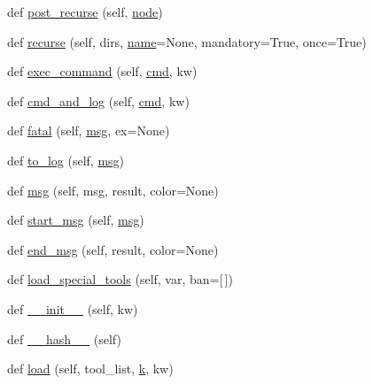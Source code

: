 \begin{DoxyCompactItemize}
\item 
def \hyperlink{classwaflib_1_1_context_1_1_context_ab818cd610ecc0c6fa981f0cde9f3dd13}{post\+\_\+recurse} (self, \hyperlink{structnode}{node})
\item 
def \hyperlink{classwaflib_1_1_context_1_1_context_a10e3b0d5e63bb03a0a7adbb32c3dceab}{recurse} (self, dirs, \hyperlink{lib_2expat_8h_a1b49b495b59f9e73205b69ad1a2965b0}{name}=None, mandatory=True, once=True)
\item 
def \hyperlink{classwaflib_1_1_context_1_1_context_aaa7d209a0d05f2f8e45fc11b83c72dba}{exec\+\_\+command} (self, \hyperlink{sndfile__play_8m_adfc5ba7e22f5e4a6221c12a70503bef3}{cmd}, kw)
\item 
def \hyperlink{classwaflib_1_1_context_1_1_context_aaa63c5a7ac60f1bf164febe6642d270f}{cmd\+\_\+and\+\_\+log} (self, \hyperlink{sndfile__play_8m_adfc5ba7e22f5e4a6221c12a70503bef3}{cmd}, kw)
\item 
def \hyperlink{classwaflib_1_1_context_1_1_context_a42739307965d7ef470985d7bb7408788}{fatal} (self, \hyperlink{classwaflib_1_1_context_1_1_context_a7495a2e04e528aa54bda3cadf08240cb}{msg}, ex=None)
\item 
def \hyperlink{classwaflib_1_1_context_1_1_context_a596fa2d8dc5a61602101f43ec1eb3e7e}{to\+\_\+log} (self, \hyperlink{classwaflib_1_1_context_1_1_context_a7495a2e04e528aa54bda3cadf08240cb}{msg})
\item 
def \hyperlink{classwaflib_1_1_context_1_1_context_a7495a2e04e528aa54bda3cadf08240cb}{msg} (self, msg, result, color=None)
\item 
def \hyperlink{classwaflib_1_1_context_1_1_context_a344a0dff2c7b0d2d76057d55b83c3f16}{start\+\_\+msg} (self, \hyperlink{classwaflib_1_1_context_1_1_context_a7495a2e04e528aa54bda3cadf08240cb}{msg})
\item 
def \hyperlink{classwaflib_1_1_context_1_1_context_a6340799a7fa4dc1230d13b7c08eec789}{end\+\_\+msg} (self, result, color=None)
\item 
def \hyperlink{classwaflib_1_1_context_1_1_context_a95a53e6c363450df77f847bec6c56696}{load\+\_\+special\+\_\+tools} (self, var, ban=\mbox{[}$\,$\mbox{]})
\item 
def \hyperlink{classwaflib_1_1_context_1_1_context_ab8fabf802b21a8a8e77c3e3811c58c84}{\+\_\+\+\_\+init\+\_\+\+\_\+} (self, kw)
\item 
def \hyperlink{classwaflib_1_1_context_1_1_context_ae8096e428213ed965d8cd5629c2481a1}{\+\_\+\+\_\+hash\+\_\+\+\_\+} (self)
\item 
def \hyperlink{classwaflib_1_1_context_1_1_context_ad214db6a7b3ce05051972f7d073a74f2}{load} (self, tool\+\_\+list, \hyperlink{rfft2d_test_m_l_8m_adc468c70fb574ebd07287b38d0d0676d}{k}, kw)

\end{DoxyCompactItemize}

